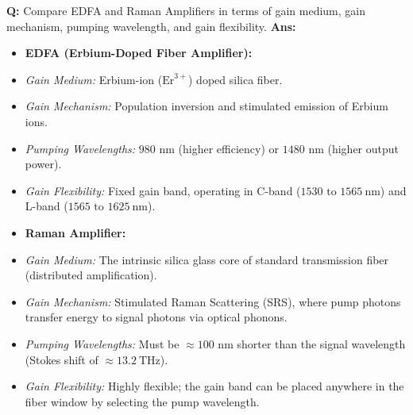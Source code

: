 \documentclass[10pt,a4paper,twocolumn]{article}
\begin{document}
\begin{tcolorbox}[
  colback=white,
  colframe=UnitColorFive,
  colbacktitle=gray!10!white,
  coltitle=black,
  fonttitle=\bfseries\sffamily\small,
  title={Unit V $\bullet$ Card 1: EDFA vs. Raman Amplifiers},
  boxrule=1.2pt,
  arc=2mm,
  outer arc=2mm,
  boxsep=1.5mm,
  top=1mm,
  bottom=1mm,
  left=1.5mm,
  right=1.5mm,
  before skip=2.5mm,
  after skip=2.5mm
]
\textbf{Q:} Compare EDFA and Raman Amplifiers in terms of gain medium, gain mechanism, pumping wavelength, and gain flexibility.
\tcbline
\textbf{Ans:} \begin{itemize}
  \item   \textbf{EDFA (Erbium-Doped Fiber Amplifier):}
  \item   \textit{Gain Medium:} Erbium-ion ($\text{Er}^{3+}$) doped silica fiber.
  \item   \textit{Gain Mechanism:} Population inversion and stimulated emission of Erbium ions.
  \item   \textit{Pumping Wavelengths:} $980\text{ nm}$ (higher efficiency) or $1480\text{ nm}$ (higher output power).
  \item   \textit{Gain Flexibility:} Fixed gain band, operating in C-band ($1530 \text{ to } 1565\ \text{nm}$) and L-band ($1565 \text{ to } 1625\ \text{nm}$).
  \item   \textbf{Raman Amplifier:}
  \item   \textit{Gain Medium:} The intrinsic silica glass core of standard transmission fiber (distributed amplification).
  \item   \textit{Gain Mechanism:} Stimulated Raman Scattering (SRS), where pump photons transfer energy to signal photons via optical phonons.
  \item   \textit{Pumping Wavelengths:} Must be $\approx 100\text{ nm}$ shorter than the signal wavelength (Stokes shift of $\approx 13.2\ \text{THz}$).
  \item   \textit{Gain Flexibility:} Highly flexible; the gain band can be placed anywhere in the fiber window by selecting the pump wavelength.
\end{itemize}
\end{tcolorbox}
\end{document}
